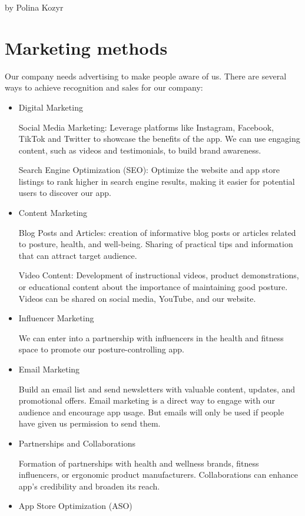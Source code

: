 by Polina Kozyr

\section{Marketing methods}

Our company needs advertising to make people aware of us. There are several ways to achieve recognition and sales for our company:

\begin{itemize}
    \item Digital Marketing

    Social Media Marketing: Leverage platforms like Instagram, Facebook, TikTok and Twitter to showcase the benefits of the app. We can use engaging content, such as videos and testimonials, to build brand awareness.
    
    Search Engine Optimization (SEO): Optimize the website and app store listings to rank higher in search engine results, making it easier for potential users to discover our app.
    \item Content Marketing

    Blog Posts and Articles: creation of informative blog posts or articles related to posture, health, and well-being. Sharing of practical tips and information that can attract target audience.
    
    Video Content: Development of instructional videos, product demonstrations, or educational content about the importance of maintaining good posture. Videos can be shared on social media, YouTube, and our website.
    \item Influencer Marketing
    
    We can enter into a partnership with influencers in the health and fitness space to promote our posture-controlling app. 
    \item Email Marketing
    
    Build an email list and send newsletters with valuable content, updates, and promotional offers. Email marketing is a direct way to engage with our audience and encourage app usage. But emails will only be used if people have given us permission to send them.
    \item Partnerships and Collaborations

    Formation of partnerships with health and wellness brands, fitness influencers, or ergonomic product manufacturers. Collaborations can enhance app's credibility and broaden its reach.
    \item App Store Optimization (ASO)
    

\end{itemize}
